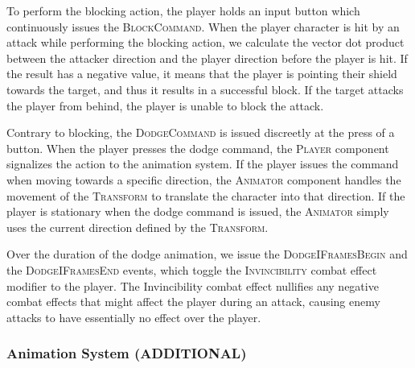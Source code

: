 To perform the blocking action, the player holds an input button which continuously issues the \textsc{BlockCommand}. When the player character is hit by an attack while performing the blocking action, we calculate the vector dot product between the attacker direction and the player direction before the player is hit. If the result has a negative value, it means that the player is pointing their shield towards the target, and thus it results in a successful block. If the target attacks the player from behind, the player is unable to block the attack.


Contrary to blocking, the \textsc{DodgeCommand} is issued discreetly at the press of a button. When the player presses the dodge command, the \textsc{Player} component signalizes the action to the animation system. If the player issues the command when moving towards a specific direction, the \textsc{Animator} component handles the movement of the \textsc{Transform} to translate the character into that direction. If the player is stationary when the dodge command is issued, the \textsc{Animator} simply uses the current direction defined by the \textsc{Transform}.

Over the duration of the dodge animation, we issue the \textsc{DodgeIFramesBegin} and the \textsc{DodgeIFramesEnd} events, which toggle the \textsc{Invincibility} combat effect modifier to the player. The Invincibility combat effect nullifies any negative combat effects that might affect the player during an attack, causing enemy attacks to have essentially no effect over the player.



\subsubsection{Animation System (ADDITIONAL)}

